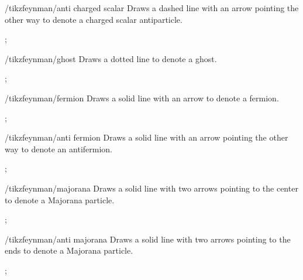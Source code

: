 \documentclass[a4paper,final]{ltxdoc}
\begin{document}
\begin{key}{/tikzfeynman/anti charged scalar}
  Draws a dashed line with an arrow pointing the other way to denote a charged scalar antiparticle.

\begin{codeexample}[]
;
\end{codeexample}
\end{key}

\begin{key}{/tikzfeynman/ghost}
  Draws a dotted line to denote a ghost.

\begin{codeexample}[]
;
\end{codeexample}
\end{key}


\begin{key}{/tikzfeynman/fermion}
  Draws a solid line with an arrow to denote a fermion.

\begin{codeexample}[]
;
\end{codeexample}
\end{key}

\begin{key}{/tikzfeynman/anti fermion}
  Draws a solid line with an arrow pointing the other way to denote an antifermion.

\begin{codeexample}[]
;
\end{codeexample}
\end{key}

\begin{key}{/tikzfeynman/majorana}
  Draws a solid line with two arrows pointing to the center to denote a Majorana particle.

\begin{codeexample}[]
;
\end{codeexample}
\end{key}

\begin{key}{/tikzfeynman/anti majorana}
  Draws a solid line with two arrows pointing to the ends to denote a Majorana particle.

\begin{codeexample}[]
;
\end{codeexample}
\end{key}
\end{document}

